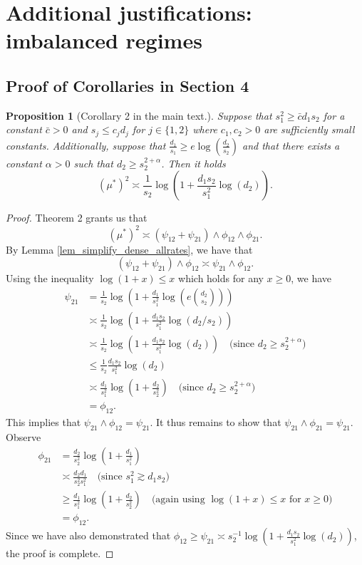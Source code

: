 \documentclass{article}
\newtheorem{proposition}{Proposition}
\theoremstyle{remark}
\begin{document}
\section{Additional justifications: imbalanced regimes}\label{app_additional_justifications}

\subsection{Proof of Corollaries in Section 4}

\begin{proposition}[Corollary 2 in the main text.]
        Suppose that $s_1^2 \geq \bar{c}d_1 s_2$ for a constant $\bar{c} > 0$ and $s_j \leq c_j d_j$ for $j \in \{1, 2\}$ where $c_1,c_2 > 0$ are sufficiently small constants. Additionally, suppose that $\frac{d_1}{s_1} \geq e \log(\frac{d_2}{s_2})$ and that there exists a constant $\alpha > 0$ such that $d_2 \geq s_2^{2 + \alpha}$. Then it holds
\begin{equation}
    (\mu^*)^2 \asymp \frac{1}{s_2}\log\left(1 + \frac{d_1s_2}{s_1^2}\log(d_2)\right).
\end{equation}
    \end{proposition}
    \begin{proof}
        Theorem 2 grants us that 
        \[(\mu^*)^2 \asymp (\psi_{12} + \psi_{21}) \land \phi_{12} \land \phi_{21}.\]
        By Lemma \ref{lem_simplify_dense_allrates}, we have that
        \[(\psi_{12} + \psi_{21}) \land \phi_{12} \asymp \psi_{21} \land \phi_{12}.\]
        Using the inequality $\log(1+x) \le x$ which holds for any $x \ge 0$, we have
\begin{align*}
\psi_{21} &= \frac{1}{s_2} \log\left(1 + \frac{d_1}{s_1^2} \log\left(e\binom{d_2}{s_2}\right)\right) \\
&\asymp \frac{1}{s_2} \log\left(1 + \frac{d_1 s_2}{s_1^2} \log(d_2/s_2)\right) \\
&\asymp \frac{1}{s_2} \log\left(1 + \frac{d_1 s_2}{s_1^2} \log(d_2)\right) \quad \text{(since $d_2 \geq s_2^{2 + \alpha}$)}\\
&\le \frac{1}{s_2} \frac{d_1 s_2}{s_1^2} \log(d_2) \\
&\asymp \frac{d_1}{s_1^2} \log\left(1 + \frac{d_2}{s_2^2}\right) \quad \text{(since $d_2 \geq s_2^{2 + \alpha}$)}  \\
&= \phi_{12}.
\end{align*}
This implies that $\psi_{21} \land \phi_{12} = \psi_{21}$. It thus remains to show that $\psi_{21} \land \phi_{21} = \psi_{21}$. Observe
\begin{align*}
    \phi_{21} &= \frac{d_2}{s^2_2}\log\left(1 + \frac{d_1}{s_1^2}\right) \\
    &\asymp \frac{d_2d_1}{s^2_2s_1^2} \quad \text{(since $s_1^2 \gtrsim d_1s_2$)} \\
    &\geq \frac{d_1}{s_1^2}\log\left(1 + \frac{d_2}{s_2^2}\right) \quad \text{(again using $\log(1+x) \leq x$ for $x \geq 0$)} \\
    &= \phi_{12}.
\end{align*}
Since we have also demonstrated that $\phi_{12} \geq \psi_{21} \asymp s_2^{-1}\log\left(1 + \frac{d_1 s_2}{s_1^2} \log(d_2)\right)$, the proof is complete.
    \end{proof}
\end{document}
